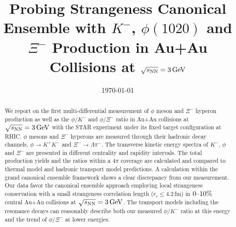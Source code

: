 \documentclass[%
 reprint,	
showpacs,
 amsmath,amssymb,
 aps,
 superscriptaddress,
]{revtex4-1}
\begin{document}

\title{Probing Strangeness Canonical Ensemble with $K^{-}$, $\phi(1020)$ and $\Xi^{-}$ Production in Au+Au Collisions at ${\sqrt{s_{\rm NN}} = \rm{3\,GeV}}$}%



\date{\today}%

\begin{abstract}


We report on the first multi-differential measurement of $\phi$ meson and $\Xi^{-}$ hyperon production as well as the $\phi/K^-$ and $\phi/\Xi^-$ ratio in Au+Au collisions at ${\sqrt{s_{\rm NN}} = \rm{3\,GeV}}$ with the STAR experiment under its fixed target configuration at RHIC. $\phi$ mesons and $\Xi^{-}$ hyperons are measured through their hadronic decay channels, $\phi\rightarrow K^+K^-$ and $\Xi^-\rightarrow \Lambda\pi^-$. The transverse kinetic energy spectra of $K^-$, $\phi$ and $\Xi^{-}$ are presented in different centrality and rapidity intervals. The total production yields and the ratios within a $4\pi$ coverage are calculated and compared to thermal model and hadronic transport model predictions. A calculation within the grand canonical ensemble framework shows a clear discrepancy from our measurement. Our data favor the canonical ensemble approach employing local strangeness conservation with a small strangeness correlation length ($r_c \leq 4.2$\,fm) in $\textup{0--10\%}$ central Au+Au collisions at ${\sqrt{s_{\rm NN}} = \rm{3\,GeV}}$. The transport models including the resonance decays can reasonably describe both our measured $\phi/K^-$ ratio at this energy and the trend of $\phi/\Xi^-$ at lower energies.


\end{abstract}
\end{document}
